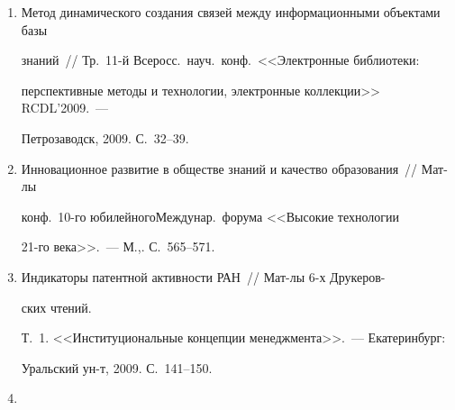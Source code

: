 \begin{enumerate}[1.]
развития России. Тр.\ 5-й Всеросс.\ науч.-практич.\ конф. 


Ч.~2.~--- М.: ИНИОН, 2009. С.~138--142.





\item {}


Метод динамического создания связей между информационными объектами базы 


знаний~// Тр.\ 11-й Всеросс.\ науч.\ конф.\ <<Электронные библиотеки: 


перспективные методы и технологии, электронные коллекции>>  RCDL'2009.~--- 


Петрозаводск, 2009. С.~32--39.





\item {}


Инновационное развитие в обществе знаний и качество образования~// Мат-лы 


конф.\ 10-го юбилейного\linebreak Междунар.\ форума <<Высокие технологии 


21-го века>>.~--- М.,. С.~565--571.





\item {}


Индикаторы патентной активности РАН~// Мат-лы 6-х Друкеров-\linebreak\vspace*{-12pt}


\pagebreak





\noindent


ских чтений. 


Т.~1. <<Институциональные концепции менеджмента>>.~--- Екатеринбург:  


Уральский ун-т, 2009.  С.~141--150.





\item {}



\end{enumerate}
